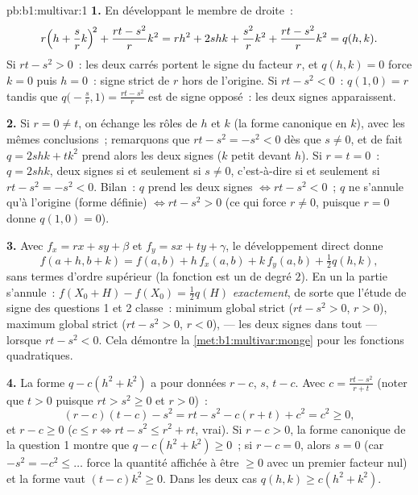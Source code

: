 \begin{solution}{pb:b1:multivar:1}
\textbf{1.} En développant le membre de droite~:
\[
r\Bigl(h + \frac srk\Bigr)^{\!2} + \frac{rt - s^2}{r}k^2
= rh^2 + 2shk + \frac{s^2}{r}k^2 + \frac{rt - s^2}{r}k^2
= q(h,k) .
\]
Si $rt - s^2 > 0$~: les deux carrés portent le signe du facteur
$r$, et $q(h,k) = 0$ force $k = 0$ puis $h = 0$~: signe strict de
$r$ hors de l'origine. Si $rt - s^2 < 0$~: $q(1, 0) = r$ tandis que
$q\bigl(-\frac sr, 1\bigr) = \frac{rt - s^2}{r}$ est de signe
opposé~: les deux signes apparaissent.

\textbf{2.} Si $r = 0 \neq t$, on échange les rôles de $h$ et $k$
(la forme canonique en $k$), avec les mêmes conclusions~;
remarquons que $rt - s^2 = -s^2 < 0$ dès que $s \neq 0$, et de fait
$q = 2shk + tk^2$ prend alors les deux signes ($k$ petit devant
$h$). Si $r = t = 0$~: $q = 2shk$, deux signes si et seulement si
$s \neq 0$, c'est-à-dire si et seulement si $rt - s^2 = -s^2 < 0$.
Bilan~: $q$ prend les deux signes $\iff rt - s^2 < 0$~; $q$ ne
s'annule qu'à l'origine (forme définie) $\iff rt - s^2 > 0$ (ce
qui force $r \neq 0$, puisque $r = 0$ donne $q(1,0) = 0$).

\textbf{3.} Avec $f_x = rx + sy + \beta$ et $f_y = sx + ty +
\gamma$, le développement direct donne
\[
f(a + h, b + k) = f(a, b) + h\,f_x(a,b) + k\,f_y(a,b)
+ \tfrac12 q(h, k),
\]
sans termes d'ordre supérieur (la fonction est un  de
degré $2$). En un  la partie  s'annule~:
$f(X_0 + H) - f(X_0) = \frac12 q(H)$ \emph{exactement}, de sorte
que l'étude de signe des questions 1 et 2 classe~: minimum global
strict ($rt - s^2 > 0$, $r > 0$), maximum global strict ($rt - s^2
> 0$, $r < 0$),  --- les deux signes dans tout 
--- lorsque $rt - s^2 < 0$. Cela démontre
la \cref{met:b1:multivar:monge} pour les fonctions quadratiques.

\textbf{4.} La forme $q - c(h^2 + k^2)$ a pour données $r - c$, $s$,
$t - c$. Avec $c = \frac{rt - s^2}{r + t}$ (noter que $t > 0$
puisque $rt > s^2 \geq 0$ et $r > 0$)~:
\[
(r - c)(t - c) - s^2 = rt - s^2 - c(r + t) + c^2 = c^2 \geq 0,
\]
et $r - c \geq 0$ ($c \leq r \iff rt - s^2 \leq r^2 + rt$,
vrai). Si $r - c > 0$, la forme canonique de la question 1 montre
que $q - c(h^2 + k^2) \geq 0$~; si $r - c = 0$, alors $s = 0$ (car
$-s^2 = -c^2 \leq \dots$ force la quantité affichée à être
$\geq 0$ avec un premier facteur nul) et la forme vaut $(t - c)k^2
\geq 0$. Dans les deux cas $q(h,k) \geq c(h^2 + k^2)$.


\end{solution}
